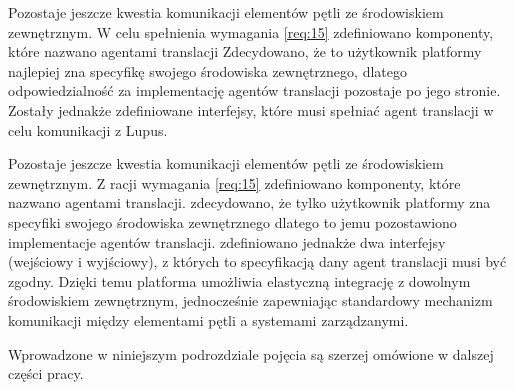 Pozostaje jeszcze kwestia komunikacji elementów pętli ze środowiskiem zewnętrznym. W celu spełnienia wymagania \ref{req:15} zdefiniowano komponenty, które nazwano agentami translacji Zdecydowano, że to użytkownik platformy najlepiej zna specyfikę swojego środowiska zewnętrznego, dlatego odpowiedzialność za implementację agentów translacji pozostaje po jego stronie. Zostały jednakże zdefiniowane interfejsy, które musi spełniać agent translacji w celu komunikacji z Lupus.

Pozostaje jeszcze kwestia komunikacji elementów pętli ze środowiskiem zewnętrznym. Z racji wymagania \ref{req:15} zdefiniowano komponenty, które nazwano agentami translacji. zdecydowano, że tylko użytkownik platformy zna specyfiki swojego środowiska zewnętrznego dlatego to jemu pozostawiono implementacje agentów translacji. zdefiniowano jednakże dwa interfejsy (wejściowy i wyjściowy), z których to specyfikacją dany agent translacji musi być zgodny. Dzięki temu platforma umożliwia elastyczną integrację z dowolnym środowiskiem zewnętrznym, jednocześnie zapewniając standardowy mechanizm komunikacji między elementami pętli a systemami zarządzanymi.

Wprowadzone w niniejszym podrozdziale pojęcia są szerzej omówione w dalszej części pracy. 

